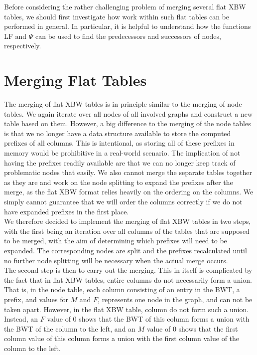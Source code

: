 \documentclass[a4paper,12pt,twoside,BCOR=10mm]{scrbook}
\begin{document}
Before considering the rather challenging problem of merging several flat XBW tables, 
we should first investigate how work within such flat tables can be performed in general. 
In particular, it is helpful to understand how 
the functions LF and $ \Psi $ can be used to find the predecessors and successors 
of nodes, respectively.


\section{Merging Flat Tables}
%

The merging of flat XBW tables is in principle similar to the merging of node tables. 
We again iterate over all nodes of all involved graphs and construct a new table 
based on them. 
However, a big difference to the merging of the node tables is that we no longer have 
a data structure available to store the computed prefixes of all columns. 
This is intentional, as storing all of these prefixes in memory would be prohibitive 
in a real-world scenario. The implication of not having the prefixes readily available 
are that we can no longer keep track of problematic nodes that easily. 
We also cannot merge the separate tables together as they are and work on the node splitting to expand the prefixes 
after the merge, as the flat XBW format relies heavily on the ordering on the columns. 
We simply cannot guarantee that we will order the columns correctly 
if we do not have expanded prefixes in the first place. \\
We therefore decided to implement the merging of flat XBW tables in two steps, 
with the first being an iteration over all columns of the tables that are supposed to be merged, 
with the aim of determining which prefixes will need to be expanded. The corresponding nodes are 
split and the prefixes recalculated until no further node splitting will be necessary when the actual 
merge occurs. \\
The second step is then to carry out the merging. This in itself is complicated by the fact 
that in flat XBW tables, entire columns do not necessarily form a union. That is, 
in the node table, each column consisting of an entry in the BWT, a prefix, and values for $ M $ and $ F $, 
represents one node in the graph, and can not be taken apart. 
However, in the flat XBW table, column do not form such a union. 
Instead, an $ F $ value of 0 shows that the BWT of this column forms a union with the BWT of the column to the left, 
and an $ M $ value of 0 shows that the first column value of this column forms a union 
with the first column value of the column to the left.
\end{document}
